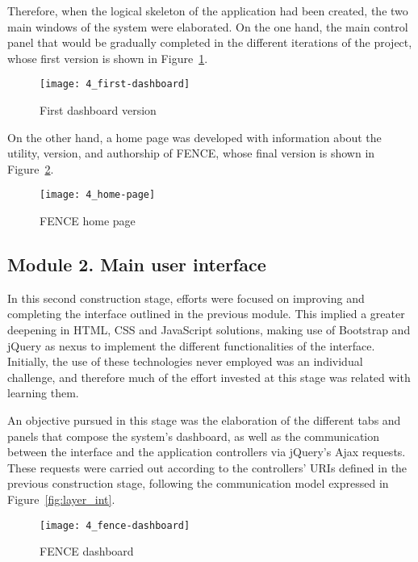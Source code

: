 Therefore, when the logical skeleton of the application had been created, the two main windows of the system were elaborated. On the one hand, the main control panel that would be gradually completed in the different iterations of the project, whose first version is shown in Figure~\ref{fig:first-dashboard}.

\begin{figure}
	\centering
	\texttt{[image: 4\_first-dashboard]}
	\caption[First dashboard version]{First dashboard version}
	\label{fig:first-dashboard}
\end{figure}

On the other hand, a home page was developed with information about the utility, version, and authorship of FENCE, whose final version is shown in Figure~\ref{fig:home-page}.

\begin{figure}
	\centering
	\texttt{[image: 4\_home-page]}
	\caption[FENCE home page]{FENCE home page}
	\label{fig:home-page}
\end{figure}

\subsection{Module 2. Main user interface}

In this second construction stage, efforts were focused on improving and completing the interface outlined in the previous module. This implied a greater deepening in HTML, CSS and JavaScript solutions, making use of Bootstrap and jQuery as nexus to implement the different functionalities of the interface. Initially, the use of these technologies never employed was an individual challenge, and therefore much of the effort invested at this stage was related with learning them.

An objective pursued in this stage was the elaboration of the different tabs and panels that compose the system's dashboard, as well as the communication between the interface and the application controllers via jQuery's Ajax requests. These requests were carried out according to the controllers' URIs defined in the previous construction stage, following the communication model expressed in Figure~\ref{fig:layer_int}.

\begin{figure}
	\centering
	\texttt{[image: 4\_fence-dashboard]}
	\caption[FENCE dashboard]{FENCE dashboard}
	\label{fig:fence-dashboard}
\end{figure}

